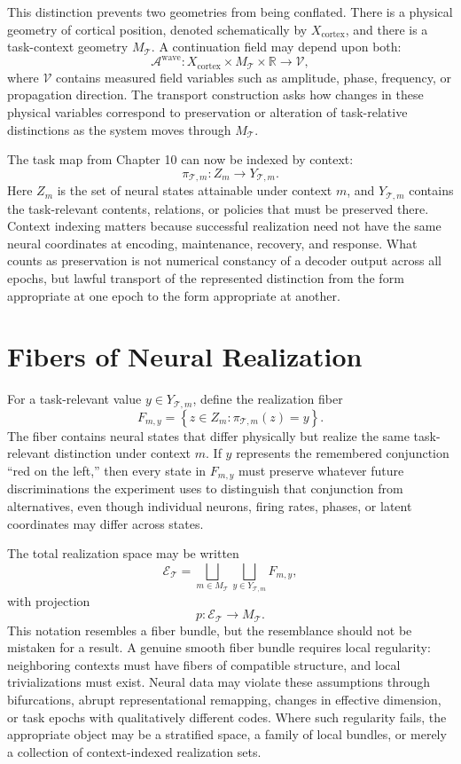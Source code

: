 \documentclass[11pt]{book}
\begin{document}
This distinction prevents two geometries from being conflated. There is a physical geometry of cortical position, denoted schematically by $X_{\mathrm{cortex}}$, and there is a task-context geometry $M_{\mathcal T}$. A continuation field may depend upon both:
\[
\mathcal A^{\mathrm{wave}}
:
X_{\mathrm{cortex}}\times M_{\mathcal T}\times\mathbb R
\longrightarrow
\mathcal V,
\]
where $\mathcal V$ contains measured field variables such as amplitude, phase, frequency, or propagation direction. The transport construction asks how changes in these physical variables correspond to preservation or alteration of task-relative distinctions as the system moves through $M_{\mathcal T}$.

The task map from Chapter 10 can now be indexed by context:
\[
\pi_{\mathcal T,m}:Z_m\longrightarrow Y_{\mathcal T,m}.
\]
Here $Z_m$ is the set of neural states attainable under context $m$, and $Y_{\mathcal T,m}$ contains the task-relevant contents, relations, or policies that must be preserved there. Context indexing matters because successful realization need not have the same neural coordinates at encoding, maintenance, recovery, and response. What counts as preservation is not numerical constancy of a decoder output across all epochs, but lawful transport of the represented distinction from the form appropriate at one epoch to the form appropriate at another.

\section*{Fibers of Neural Realization}

For a task-relevant value $y\in Y_{\mathcal T,m}$, define the realization fiber
\[
F_{m,y}
=
\left\{
z\in Z_m:
\pi_{\mathcal T,m}(z)=y
\right\}.
\]
The fiber contains neural states that differ physically but realize the same task-relevant distinction under context $m$. If $y$ represents the remembered conjunction ``red on the left,'' then every state in $F_{m,y}$ must preserve whatever future discriminations the experiment uses to distinguish that conjunction from alternatives, even though individual neurons, firing rates, phases, or latent coordinates may differ across states.

The total realization space may be written
\[
\mathcal E_{\mathcal T}
=
\bigsqcup_{m\in M_{\mathcal T}}
\bigsqcup_{y\in Y_{\mathcal T,m}}
F_{m,y},
\]
with projection
\[
p:\mathcal E_{\mathcal T}\longrightarrow M_{\mathcal T}.
\]
This notation resembles a fiber bundle, but the resemblance should not be mistaken for a result. A genuine smooth fiber bundle requires local regularity: neighboring contexts must have fibers of compatible structure, and local trivializations must exist. Neural data may violate these assumptions through bifurcations, abrupt representational remapping, changes in effective dimension, or task epochs with qualitatively different codes. Where such regularity fails, the appropriate object may be a stratified space, a family of local bundles, or merely a collection of context-indexed realization sets.
\end{document}
